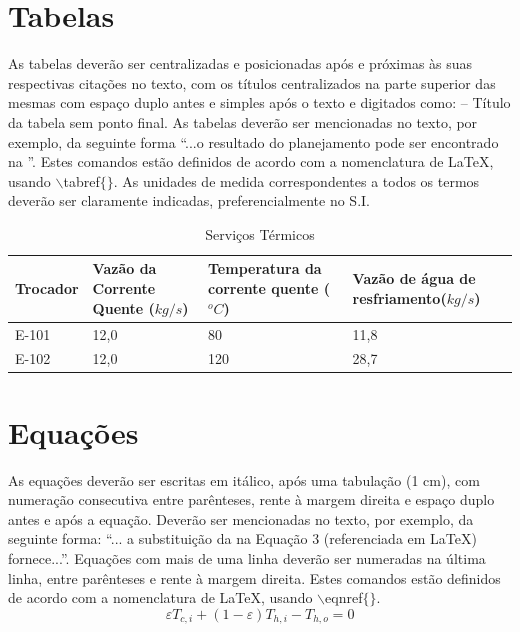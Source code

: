 \documentclass[a4paper,12pt]{article}
\begin{document}
\section{Tabelas}
As tabelas deverão ser centralizadas e posicionadas após e próximas às
suas respectivas citações no texto, com os títulos centralizados na
parte superior das mesmas com espaço duplo antes e simples após o texto
e digitados como:  -- Título da tabela sem ponto
final. As tabelas deverão ser mencionadas no texto, por exemplo, da
seguinte forma ``...o resultado do planejamento pode ser encontrado na
''. Estes comandos estão
definidos de acordo com a nomenclatura de \LaTeX, usando 
$\backslash$tabref$\{\}$. As unidades de medida correspondentes a todos
os termos deverão ser claramente indicadas, preferencialmente no S.I.
\begin{table}[!htb]
  \caption{Serviços Térmicos}
  \begin{center}
    \begin{tabular}{| l p{4cm} p{4cm} p{4cm} |}
    \hline
    Trocador & Vazão da Corrente Quente ($kg/s$)
    &  Temperatura da corrente quente ($^{o}C$)
    & Vazão de água de resfriamento($kg/s$)\\ \hline
    E-101 & 12,0 & 80  & 11,8 \\
    E-102 & 12,0 & 120 & 28,7 \\
    \hline
    \end{tabular}
  \end{center}
  \label{tab:tabela}
\end{table}

\section{Equações}
As equações deverão ser escritas em itálico, após uma tabulação (1 cm),
com numeração consecutiva entre parênteses, rente à margem direita e
espaço duplo antes e após a equação. Deverão ser mencionadas no texto,
por exemplo, da seguinte forma: “... a substituição da
 na Equação 3 (referenciada em \LaTeX) fornece...”.
Equações com mais de uma linha deverão ser numeradas na última linha,
entre parênteses e rente à margem direita. Estes comandos estão
definidos de acordo com a nomenclatura de \LaTeX, usando 
$\backslash$eqnref$\{\}$.
\begin{equation}
\varepsilon T_{c,i} + (1-\varepsilon) T_{h,i} - T_{h,o} = 0
\label{eq:radiacao}
\end{equation}
\end{document}
